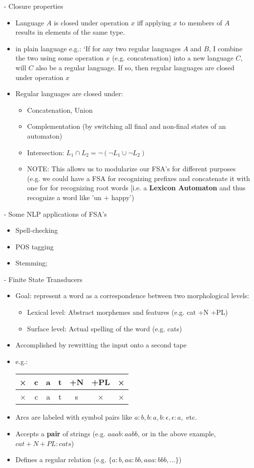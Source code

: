 \documentclass[11pt]{article}
\begin{document}
- Closure properties
\begin{itemize}
 \item Language $A$ is closed under operation $x$ iff applying $x$ to members of $A$ results in elements of the same type.
 \item in plain language e.g.: `If for any two regular languages $A$ and $B$, I combine the two using some operation $x$ (e.g. concatenation) into a new language $C$, will $C$ also be a regular language. If so, then regular languages are closed under operation $x$ 
 \item Regular languages are closed under:
  \begin{itemize}
   \item Concatenation, Union
   \item Complementation (by switching all final and non-final states of an automaton)
   \item Intersection: $L_1 \cap L_2 =  \neg(\neg L_1 \cup \neg L_2)$
   \item NOTE: This allows us to modularize our FSA's for different purposes (e.g. we could have a FSA for recognizing prefixes and concatenate it with one for for recognizing root words [i.e. a {\bf Lexicon Automaton} and thus recognize a word like 'un + happy')
  \end{itemize}
\end{itemize}
- Some NLP applications of FSA's
\begin{itemize}
 \item Spell-checking
 \item POS tagging
 \item Stemming;
\end{itemize}
- Finite State Transducers
\begin{itemize}
 \item Goal: represent a word as a correspondence between two morphological levels:
  \begin{itemize}
   \item Lexical level: Abstract morphemes and features (e.g. cat +N +PL)
   \item Surface level: Actual spelling of the word (e.g. cats)
  \end{itemize}
 \item Accomplished by rewritting the input onto a second tape
 \item e.g.: 
\begin{center}
\begin{tabular}{|c|c|c|c|c|c|c|}\hline
× & c & a & t & +N & +PL & ×\\\hline
× & c & a & t & s & × & ×\\\hline
\end{tabular}
\end{center}
 \item Arcs are labeled with symbol pairs like $a:b, b:a, b:\epsilon, \epsilon:a,$ etc.
 \item Accepts a {\bf pair} of strings (e.g. $aaab:aabb$, or in the above example, $cat+N+PL:cats$)
 \item Defines a regular relation (e.g. $\{ a:b, aa:bb, aaa:bbb, ...\}$)
\end{itemize}
\end{document}
